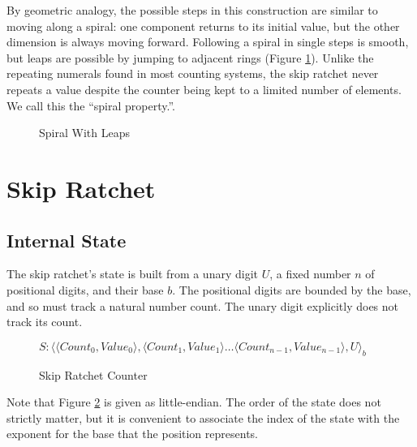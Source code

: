 \documentclass{article}
\begin{document}
	By geometric analogy, the possible steps in this construction are similar to moving along a spiral: one component returns to its initial value, but the other dimension is always moving forward. Following a spiral in single steps is smooth, but leaps are possible by jumping to adjacent rings (Figure \ref{fig:spiral-metaphor}). Unlike the repeating numerals found in most counting systems, the skip ratchet never repeats a value despite the counter being kept to a limited number of elements. We call this the ``spiral property.''.
	
	\begin{figure}[h]
		\centering
		
		
		\caption{Spiral With Leaps}
		\label{fig:spiral-metaphor}
	\end{figure}

	\FloatBarrier
	
	\section{Skip Ratchet}
	
	\subsection{Internal State}
	
	The skip ratchet's state is built from a unary digit $U$, a fixed number $n$ of positional digits, and their base $b$. The positional digits are bounded by the base, and so must track a natural number count. The unary digit explicitly does not track its count.
	
	\begin{figure}[h]
		\centering
		
		$S : \langle \langle Count_{0}, Value_{0} \rangle, \langle Count_{1}, Value_{1} \rangle \ldots \langle Count_{n-1}, Value_{n-1} \rangle, U\rangle_{b}$
		
		\caption{Skip Ratchet Counter}
		\label{fig:counter}
	\end{figure}

	Note that Figure \ref{fig:counter} is given as little-endian. The order of the state does not strictly matter, but it is convenient to associate the index of the state with the exponent for the base that the position represents.
	
\end{document}
